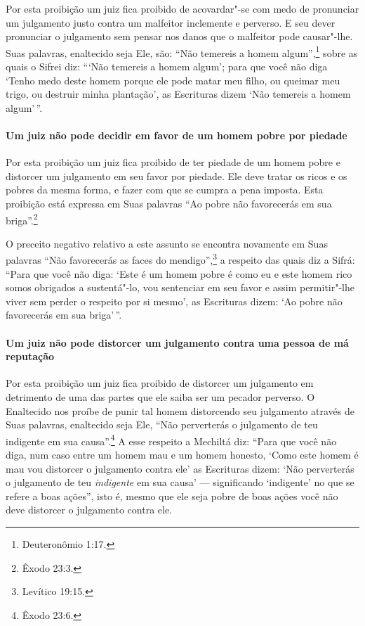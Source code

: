 \begin{multicols}{2}
Por esta proibição um juiz fica proibido de acovardar"-se com medo de
pronunciar um julgamento justo contra um malfeitor inclemente e
perverso. E seu dever pronunciar o julgamento sem pensar nos danos que
o malfeitor pode causar"-lhe. Suas palavras, enaltecido seja Ele, são:
``Não temereis a homem algum'',\footnote{Deuteronômio 1:17.} sobre as quais o
Sifrei\starr{} diz: ```Não temereis a homem algum'; para que você não diga
`Tenho medo deste homem porque ele pode matar meu filho, ou queimar meu
trigo, ou destruir minha plantação', as Escrituras dizem `Não temereis a
homem algum'\,''.

\paragraph{Um juiz não pode decidir em favor de um homem pobre por piedade}

Por esta proibição um juiz fica proibido de ter piedade de um homem
pobre e distorcer um julgamento em seu favor por piedade. Ele deve
tratar os ricos e os pobres da mesma forma, e fazer com que se cumpra a
pena imposta. Esta proibição está expressa em Suas palavras ``Ao pobre
não favorecerás em sua briga''.\footnote{Êxodo 23:3.}

O preceito negativo relativo a este assunto se encontra novamente em
Suas palavras ``Não favorecerás as faces do mendigo'',\footnote{Levítico 19:15.}
a respeito das quais diz a Sifrá\starr: ``Para que você não diga: `Este é um
homem pobre é como eu e este homem rico somos obrigados a sustentá"-lo,
vou sentenciar em seu favor e assim permitir"-lhe viver sem perder o
respeito por si mesmo', as Escrituras dizem: `Ao pobre não favorecerás
em sua briga'\,''.

\paragraph{Um juiz não pode distorcer um julgamento contra uma pessoa de má reputação}

Por esta proibição um juiz fica proibido de distorcer um julgamento em
detrimento de uma das partes que ele saiba ser um pecador perverso. O
Enaltecido nos proíbe de punir tal homem distorcendo seu julgamento
através de Suas palavras, enaltecido seja Ele, ``Não perverterás o
julgamento de teu indigente em sua causa''.\footnote{Êxodo 23:6.} A esse
respeito a Mechiltá\starr{} diz: ``Para que você não diga, num caso entre um
homem mau e um homem honesto, `Como este homem é mau vou distorcer o
julgamento contra ele' as Escrituras dizem: `Não perverterás o
julgamento de teu \emph{indigente} em sua causa' --- significando
`indigente' no que se refere a boas ações'', isto é, mesmo que ele seja
pobre de boas ações você não deve distorcer o julgamento contra ele.


\end{multicols}
